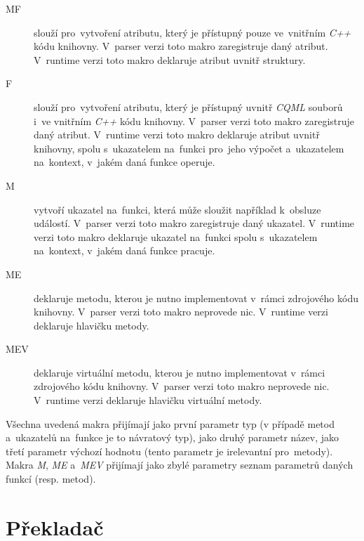 \documentclass[11pt,twoside,a4paper]{book}
\begin{document}
\begin{description}
\item[MF] slouží pro~vytvoření atributu, který je přístupný pouze ve~vnitřním \textit{C++} kódu knihovny. V~parser verzi toto makro zaregistruje daný atribut. V~runtime verzi toto makro deklaruje atribut uvnitř struktury.
\item[F] slouží pro~vytvoření atributu, který je přístupný uvnitř \textit{CQML} souborů i~ve vnitřním \textit{C++} kódu knihovny. V~parser verzi toto makro zaregistruje daný atribut. V~runtime verzi toto makro deklaruje atribut uvnitř knihovny, spolu s~ukazatelem na~funkci pro~jeho výpočet a~ukazatelem na~kontext, v~jakém daná funkce operuje.
\item[M] vytvoří ukazatel na~funkci, která může sloužit například k~obsluze událostí. V~parser verzi toto makro zaregistruje daný ukazatel. V~runtime verzi toto makro deklaruje ukazatel na~funkci spolu s~ukazatelem na~kontext, v~jakém daná funkce pracuje. 
\item[ME] deklaruje metodu, kterou je nutno implementovat v~rámci zdrojového kódu knihovny. V~parser verzi toto makro neprovede nic. V~runtime verzi deklaruje hlavičku metody.
\item[MEV] deklaruje virtuální metodu, kterou je nutno implementovat v~rámci zdrojového kódu knihovny. V~parser verzi toto makro neprovede nic. V~runtime verzi deklaruje hlavičku virtuální metody.
\end{description}
Všechna uvedená makra přijímají jako první parametr typ (v případě metod a~ukazatelů na~funkce je to návratový typ), jako druhý parametr název, jako třetí parametr výchozí hodnotu (tento parametr je irelevantní pro~metody). Makra \textit{M}, \textit{ME} a~\textit{MEV} přijímají jako zbylé parametry seznam parametrů daných funkcí (resp. metod).\\



\section{\label{SEC:transImpl}Překladač}
\end{document}

